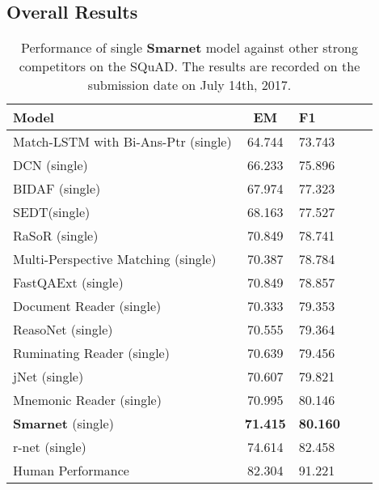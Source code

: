 \documentclass[letterpaper]{article} %
\begin{document}
 \subsection{Overall Results}
 \begin{table}[!t]
	\centering
	\begin{tabular}{lclcl}
		\toprule
		Model & EM &F1 \\
		\midrule
		Match-LSTM with Bi-Ans-Ptr (single) &64.744&73.743\\
		DCN (single) &66.233&75.896\\
		BIDAF (single) &67.974 &77.323 \\
		SEDT(single) &68.163 &77.527\\
		RaSoR (single) &70.849 &78.741\\
		Multi-Perspective Matching (single) &70.387 &78.784 \\
		FastQAExt (single) &70.849 &78.857\\
		Document Reader (single) &70.333 &79.353 \\
		ReasoNet (single) &70.555 &79.364 \\
		Ruminating Reader (single) &70.639 &79.456 \\
		jNet (single) &70.607 &79.821 \\
		Mnemonic Reader (single) &70.995 &80.146 \\
		\textbf{Smarnet} (single) &\textbf{71.415} &\textbf{80.160} \\
		r-net (single) &74.614 &82.458 \\
		\midrule
		Human Performance &82.304        &91.221  \\
		\bottomrule	
	\end{tabular}
	\caption{Performance of single \textbf{Smarnet} model against other strong competitors on the SQuAD. The results are recorded on the submission date on July 14th, 2017.}
\end{table}
\end{document}
